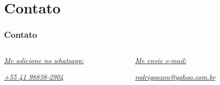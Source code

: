 \documentclass{beamer}
\begin{document}
\section{Contato}
\begin{frame}
\frametitle{Contato}

\begin{columns}[t]
\begin{column}{5cm}


\textit{\textcolor{blue}{\href{https://api.whatsapp.com/send?phone=5541988382904&text=Ol\%C3\%A1\%20Rodrigo\%2C\%20vi\%20seu\%20portf\%C3\%B3lio\%20no\%20linkedin\%2C\%20tenho\%20interesse\%20em\%20conhecer\%20um\%20pouco\%20mais\%20do\%20seu\%20trabalho.\%20Podemos\%20conversar\%20a\%20respeito\%20\%3F}{Me adicione no whatsapp:}}}


\vspace{.5cm}

\textit{\textcolor{blue}{\href{https://api.whatsapp.com/send?phone=5541988382904&text=Ol\%C3\%A1\%20Rodrigo\%2C\%20vi\%20seu\%20portf\%C3\%B3lio\%20no\%20linkedin\%2C\%20tenho\%20interesse\%20em\%20conhecer\%20um\%20pouco\%20mais\%20do\%20seu\%20trabalho.\%20Podemos\%20conversar\%20a\%20respeito\%20\%3F}{+55 41 98838-2904}}} 


\end{column}
\begin{column}{5cm}

\textit{\textcolor{blue}{\href{mailto:rodrigoozon@yahoo.com.br}{Me envie e-mail:}}}

\vspace{.5cm}
\textit{\textcolor{blue}{\href{mailto:rodrigoozon@yahoo.com.br}{rodrigoozon@yahoo.com.br}}} \\

\end{column}
\end{columns}

\end{frame}





\end{document}
